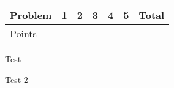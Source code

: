 \documentclass{fkpset}
\begin{document}
  \vspace{-2.3cm}

  \begin{table}[h]
    \centering
    \begin{tabular}{@{}lcccccr@{}} %
        \toprule
        Problem & 1 & 2 & 3 & 4 & 5 & Total \\ \midrule
        Points  &   &   &   &   &   &       \\ \bottomrule
    \end{tabular}
  \end{table}
  \vspace{2.3cm}
  \begin{problem}[1 (Sagan 1.13)]
    Test
  \end{problem}

  \clearpage

  \begin{problem}[2]
    Test 2
  \end{problem}
\end{document}
